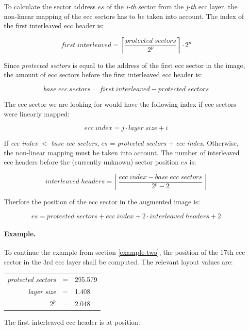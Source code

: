 To calculate the sector address $es$ of the {\em i-th} sector from the {\em j-th} 
ecc layer, the non-linear mapping of the ecc sectors has to be taken into account.
The index of the first interleaved ecc header is:

\[ first\; interleaved = \left\lceil\frac{protected\; sectors}{2^p}\right\rceil \cdot 2^p\]

Since {\em protected sectors} is equal to the address of the first ecc sector in the image,
the amount of ecc sectors before the first interleaved ecc header is:

\[ base\; ecc\; sectors = first\; interleaved - protected\; sectors\]

The ecc sector we are looking for would have the following index if ecc
sectors were linearly mapped:

\[ ecc\; index = j \cdot layer\; size + i\]

If {\em ecc index $<$ base ecc sectors}, $es$ = {\em protected sectors} + {\em ecc index}.
Otherwise, the non-linear mapping must be taken into account. The number of interleaved
ecc headers before the (currently unknown) sector position $es$ is:

\[ interleaved\; headers = \left\lfloor\frac{ecc\; index - base\; ecc\; sectors}{2^p - 2}\right\rfloor \]

Therfore the position of the ecc sector in the augmented image is:

\[ es = protected\; sectors + ecc\; index + 2 \cdot interleaved\; headers + 2 \] 

\paragraph{Example.} To continue the example from section \ref{example-two}, the
position of the 17th ecc sector in the 3rd ecc layer shall be computed. The relevant
layout values are:

\smallskip

\begin{center}
\begin{tabular}{rll}
{\em protected sectors} & = & 295.579 \\
{\em layer size} & = & 1.408 \\
{\em $2^p$} & = & 2.048 \\
\end{tabular}
\end{center}

The first interleaved ecc header is at position:

